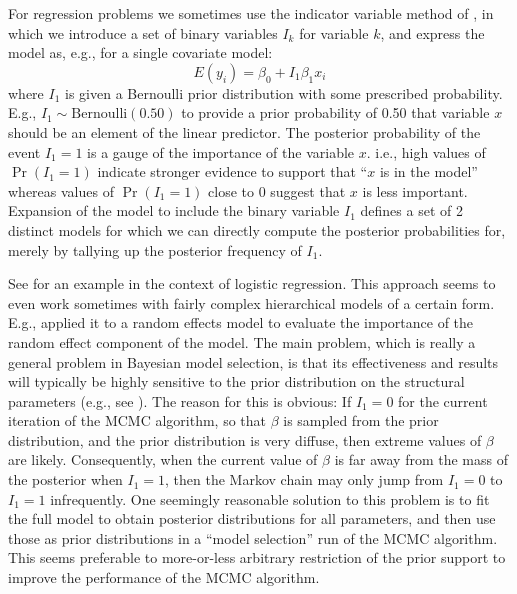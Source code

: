 For regression problems we sometimes use the indicator variable method
of \citet{kuo_mallic:1998}, in 
which we introduce a set of binary variables $I_{k}$ for variable
$k$, and express the model as, e.g., for a single covariate model:
 \[
 E(y_i) = \beta_0 + I_{1} \beta_1 x_{i}
\]
where $I_{1}$ is given a Bernoulli prior distribution with some prescribed
probability. E.g., $I_{1} \sim \mbox{Bernoulli}(0.50)$ to provide a prior probability
of 0.50 that variable $x$ should be an element of the linear
predictor. The posterior probability of the event $I_{1}=1$ is a gauge of
the importance of the variable $x$. i.e., high values of $\Pr(I_{1}=1)$
indicate stronger evidence to support that ``$x$ is in the model''
whereas values of $\Pr(I_{1}=1)$ close to 0 suggest that $x$ is less
important.  Expansion of the model to include the binary variable
$I_{1}$ defines a set of 2 distinct models for which we can directly
compute the posterior probabilities for, merely by tallying up the
posterior frequency of $I_{1}$.

See
\citet[][Chapt. 3]{royle_dorazio:2008} for an example in the context
of logistic regression. This approach seems to even work sometimes
with fairly complex hierarchical models of a certain form. E.g.,
\citet{royle:2008} applied it to a random effects model to evaluate
the importance of the random effect component of the model.  The main
problem, which is really a general problem in Bayesian model
selection, is that its effectiveness and results will
typically be highly sensitive to the prior distribution on the
structural parameters (e.g., see \citet[][table 3.6]{royle_dorazio:2008}).
The reason for this is obvious: If $I_{1} = 0$ for the current
iteration of the MCMC algorithm, so that $\beta$ is sampled from the
prior distribution, and the prior distribution is very diffuse, then
extreme values of $\beta$ are likely. Consequently, when the current value of
$\beta$ is
far away from the mass of the posterior when $I_{1}=1$, then the Markov
chain may only jump from $I_{1}=0$ to $I_{1}=1$ infrequently.  One seemingly
reasonable solution to this problem \citep{aitkin:1991}
is to fit the full
model to obtain posterior distributions for all parameters, and then
use those as prior distributions in a ``model selection'' run of the
MCMC algorithm.  This seems preferable to more-or-less arbitrary restriction of
the prior support to improve the performance of the MCMC algorithm.

